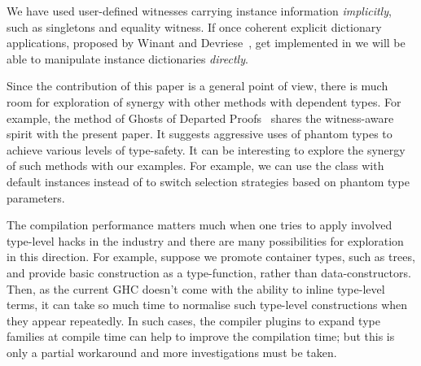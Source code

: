 \documentclass[demotion-paper.tex]{subfiles}
\begin{document}
We have used user-defined witnesses carrying instance information \emph{implicitly}, such as singletons and equality witness.
If once coherent explicit dictionary applications, proposed by Winant and Devriese~\cite{Winant:2018wu}, get implemented in we will be able to manipulate instance dictionaries \emph{directly}.

Since the contribution of this paper is a general point of view, there is much room for exploration of synergy with other methods with dependent types.
For example, the method of Ghosts of Departed Proofs~\cite{Noonan:2018aa} shares the witness-aware spirit with the present paper.
It suggests aggressive uses of phantom types to achieve various levels of type-safety.
It can be interesting to explore the synergy of such methods with our examples.
For example, we can use the  class with default instances instead of  to switch selection strategies based on phantom type parameters.

The compilation performance matters much when one tries to apply involved type-level hacks in the industry and there are many possibilities for exploration in this direction.
For example, suppose we promote container types, such as trees, and provide basic construction as a type-function, rather than data-constructors.
Then, as the current GHC doesn't come with the ability to inline type-level terms, it can take so much time to normalise such type-level constructions when they appear repeatedly.
In such cases, the compiler plugins to expand type families at compile time can help to improve the compilation time; but this is only a partial workaround and more investigations must be taken.
\end{document}
